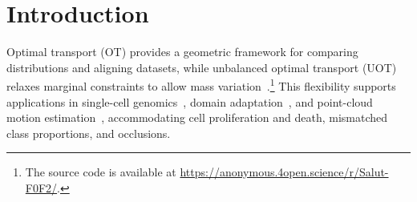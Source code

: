 \begin{abstract}
Unbalanced optimal transport (UOT) compares distributions while allowing their total mass to vary, yet its discrete formulation still involves quadratically many transport variables.
Exploiting the existence of sparse optimal couplings, we develop \ours, which combines a GPU-friendly first-order solver, \subsolver, with dynamic active-support updates to solve large-scale UOT in linear memory.
Within this alternating process, \subsolver efficiently handles the nonlinear restricted UOT subproblems, computing high-accuracy couplings and dual potentials that guide subsequent support updates.
Theoretically, we establish global convergence and a local linear rate for \subsolver, whose stopping rules ensure finite termination of \ours's support refinement to a prescribed KKT tolerance despite inexact restricted solves.
We further extend the method to sparse entropic UOT and unbalanced fused Gromov--Wasserstein problems.
Experiments demonstrate efficient scaling to million-point problems on a single GPU and broad applicability across ground costs, marginal penalty types, and penalty strengths.
Downstream evaluations on biological alignment tasks further show substantial speedups with competitive task performance.
\end{abstract}

\section{Introduction}

Optimal transport (OT) provides a geometric framework for comparing distributions and aligning datasets, while unbalanced optimal transport (UOT) relaxes marginal constraints to allow mass variation~\citep{chizat2018scaling,sejourne2023unbalanced}.\setcounter{footnote}{1}\footnote{The source code is available at {\def\UrlBreaks{\do\/}\url{https://anonymous.4open.science/r/Salut-F0F2/}}.}
This flexibility supports applications in single-cell genomics~\citep{schiebinger2019optimal,klein2025mapping}, domain adaptation~\citep{fatras2021unbalanced}, and point-cloud motion estimation~\citep{puy2020flot}, accommodating cell proliferation and death, mismatched class proportions, and occlusions.

